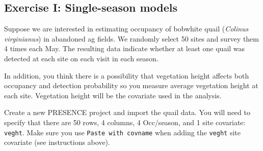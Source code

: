 \documentclass[12pt]{article}\usepackage[]{graphicx}\usepackage[]{color}
\begin{document}
\clearpage

\subsection*{Exercise I: Single-season models}

Suppose we are interested in estimating occupancy of bobwhite quail
({\it Colinus virginianus}) in abandoned ag fields. We randomly select
50 sites and survey them 4 times each May. The resulting data indicate
whether at least one quail was detected at each site on each visit in
each season.    

In addition, you think there is a possibility that vegetation height
affects both occupancy and detection probability so you measure
average vegetation height at each site. Vegetation height will be the
covariate used in the analysis. 

Create a new PRESENCE project and import the quail data. You will
need to specify that there are 50 rows, 4 columns, 4 Occ/season, and 1
site covariate: \texttt{veght}. Make sure you use \texttt{Paste with
  covname} when adding the \texttt{veght} site covariate (see
instructions above).  
\end{document}
